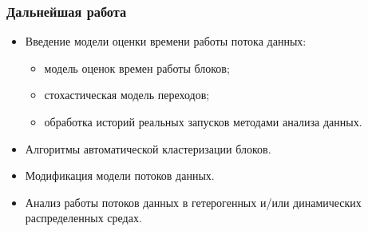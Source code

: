 \documentclass[10pt,pdf,hyperref={unicode}]{beamer}
\begin{document}
\begin{frame}
  \frametitle{Дальнейшая работа}
  \begin{itemize}
    \item Введение модели оценки времени работы потока данных:
    \begin{itemize}
      \item модель оценок времен работы блоков;
      \item стохастическая модель переходов;
      \item обработка историй реальных запусков методами анализа данных.
    \end{itemize}
    \item Алгоритмы автоматической кластеризации блоков.
    \item Модификация модели потоков данных.
    \item Анализ работы потоков данных в гетерогенных и/или динамических распределенных средах.
  \end{itemize}
\end{frame}
\end{document}
